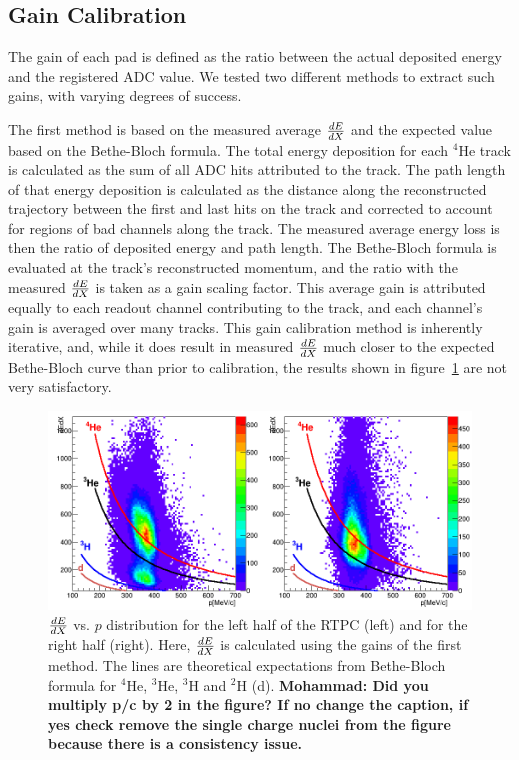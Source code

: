 \documentclass[twocolumn,showpacs,superscriptaddress,groupedaddress]{revtex4}
\begin{document}
\subsection{Gain Calibration}

The gain of each pad is defined as the ratio between the actual 
deposited energy and the registered ADC value. We tested two different 
methods to extract such gains, with varying degrees of success.

The first method is based on the measured average $\small{\frac{dE}{dX}}$
and the expected value based on the Bethe-Bloch formula. The total energy
deposition for each $^4$He track is calculated as the sum of all ADC hits
attributed to the track. The path length of that energy deposition is
calculated as the distance along the reconstructed trajectory between the first
and last hits on the track and corrected to account for regions
of bad channels along the track. The measured average energy loss is then the
ratio of deposited energy and path length. The Bethe-Bloch formula is
evaluated at the track's reconstructed momentum, and the ratio with the measured
$\small{\frac{dE}{dX}}$ is taken as a gain scaling factor. This average gain is
attributed equally to each readout channel contributing to the track, and each
channel's gain is averaged over many tracks. This gain calibration method is
inherently iterative, and, while it does result in measured $\small{\frac{dE}{dX}}$
much closer to the expected Bethe-Bloch curve than prior to calibration, the
results shown in figure~\ref{fig:dedx_p_exp_1st} are not very satisfactory.

\begin{figure}[tb]
   \includegraphics[scale=0.26]{fig/dedx_p_exp_1st.png}
   \caption{$\small{\frac{dE}{dX}}$ vs. $p$ distribution for the left half of the 
      RTPC (left) and for the right half (right). Here, $\small{\frac{dE}{dX}}$ 
   is calculated using the gains of the first method.  The lines are 
theoretical expectations from Bethe-Bloch formula for $^4$He, $^3$He, $^3$H and 
$^2$H (d).{\bf \color{red} Mohammad: Did you multiply p/c by 2 in the figure? If no 
change the caption, if yes check remove the single charge nuclei from the figure 
because there is a consistency issue.}}
\label{fig:dedx_p_exp_1st}
\end{figure}
\end{document}
